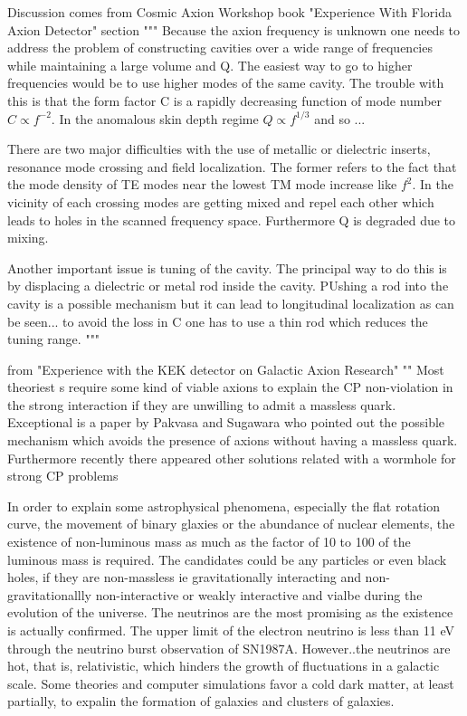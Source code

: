 \documentclass[11pt]{book}
\begin{document}
Discussion comes from Cosmic Axion Workshop book "Experience With Florida Axion Detector" section
"""
Because the axion frequency is unknown one needs to address the problem of constructing cavities over a wide range of frequencies while maintaining a large volume and Q. The easiest way to go to higher frequencies would be to use higher modes of the same cavity. The trouble with this is that the form factor C is a rapidly decreasing function of mode number $C \propto f^{-2}$. In the anomalous skin depth regime $Q \propto f^{1/3}$ and so ...

There are two major difficulties with the use of metallic or dielectric inserts, resonance mode crossing and field localization. The former refers to the fact that the mode density of TE modes near the lowest TM mode increase like $f^2$. In the vicinity of each crossing modes are getting mixed and repel each other which leads to holes in the scanned frequency space. Furthermore Q is degraded due to mixing.

Another important issue is tuning of the cavity. The principal way to do this is by displacing a dielectric or metal rod inside the cavity. PUshing a rod into the cavity is a possible mechanism but it can lead to longitudinal localization as can be seen... to avoid the loss in C one has to use a thin rod which reduces the tuning range. 
"""

from "Experience with the KEK detector on Galactic Axion Research"
""
Most theoriest s require some kind of viable axions to explain the CP non-violation in the strong interaction if they are unwilling to admit a massless quark. Exceptional is a paper by Pakvasa and Sugawara who pointed out the possible mechanism which avoids the presence of axions without having a massless quark. Furthermore recently there appeared other solutions related with a wormhole for strong CP problems

In order to explain some astrophysical phenomena, especially the flat rotation curve, the movement of binary glaxies or the abundance of nuclear elements, the existence of non-luminous mass as much as the factor of 10 to 100 of the luminous mass is required. The candidates could be any particles or even black holes, if they are non-massless ie gravitationally interacting and non-gravitationallly non-interactive or weakly interactive and vialbe during the evolution of the universe. The neutrinos are the most promising as the existence is actually confirmed. The upper limit of the electron neutrino is less than 11 eV through the neutrino burst observation of SN1987A. However..the neutrinos are hot, that is, relativistic, which hinders the growth of fluctuations in a galactic scale. Some theories and computer simulations favor a cold dark matter, at least partially, to expalin the formation of galaxies and clusters of galaxies.
\end{document}
